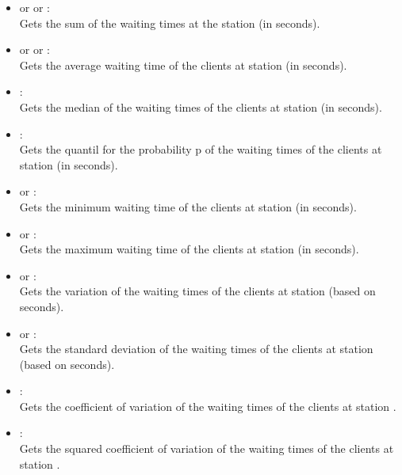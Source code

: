 \begin{itemize}

\item {} or  or :\\
Gets the sum of the waiting times at the station  (in seconds).

\item
{} or  or :\\
Gets the average waiting time of the clients at station  (in seconds).

\item
{}:\\
Gets the median of the waiting times of the clients at station  (in seconds).

\item
{}:\\
Gets the quantil for the probability p of the waiting times of the clients at station  (in seconds).

\item
{} or :\\  
Gets the minimum waiting time of the clients at station  (in seconds).

\item
{} or :\\
Gets the maximum waiting time of the clients at station  (in seconds).

\item
{} or :\\
Gets the variation of the waiting times of the clients at station  (based on seconds).

\item
{} or :\\
Gets the standard deviation of the waiting times of the clients at station  (based on seconds).

\item
{}:\\
Gets the coefficient of variation of the waiting times of the clients at station . 

\item
{}:\\
Gets the squared coefficient of variation of the waiting times of the clients at station .


\end{itemize}
